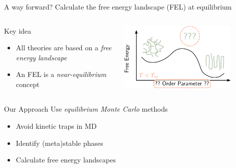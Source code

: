 \documentclass[aspectratio=169]{beamer}
\begin{document}
\begin{frame}[c]{A way forward? Calculate the free energy landscape (FEL) at equilibrium}

  \begin{columns}[T, onlytextwidth]


    \centering

    \vspace{-0.5\baselineskip}
    \begin{block}{Key idea}
      \begin{itemize}
        \item All theories are based on a \emph{free energy landscape}
        \item An FEL is a \emph{near-equilibrium} concept
      \end{itemize}
    \end{block}

    \centering
    \vspace{-12pt}
    \includegraphics[width=0.8\textwidth]{figs/fig-key_idea_shorter.pdf}

  \end{columns}

  \vspace{15pt}

  \begin{columns}[T, onlytextwidth]


    \centering

    \vspace{-0.5\baselineskip}
    \begin{block}{Our Approach}
      Use \emph{equilibrium Monte Carlo} methods
      \begin{itemize}
        \item Avoid kinetic traps in MD
        \item Identify (meta)stable phases
        \only<1>{\item Study crystalline and nematic order}
        \item Calculate free energy landscapes
      \end{itemize}
    \end{block}


\end{columns}
\end{frame}
\end{document}
